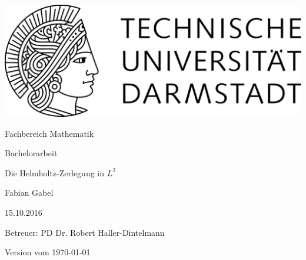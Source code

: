 \begin{titlepage}
  \begin{center}
    \vspace{1cm}
    \includegraphics[width=0.5\linewidth]{TU_Darmstadt_Logo.pdf}
    \vspace{1cm}
    
    \large{Fachbereich Mathematik}
    \vspace{2.5cm}
    
    \large{Bachelorarbeit}
    \vspace{2cm}

    \huge{Die Helmholtz-Zerlegung in $L^2$}
    
    \vspace*{3cm}    
    
		\large
                Fabian Gabel
    \vspace*{1.0cm}

    15.10.2016 \\
    \vspace*{2cm}

    Betreuer: PD Dr. Robert Haller-Dintelmann

    \vspace*{.5cm}

    \vspace*{\fill}
    \tiny{Version vom \today}
  \end{center}
\end{titlepage}
\vspace*{\fill}
